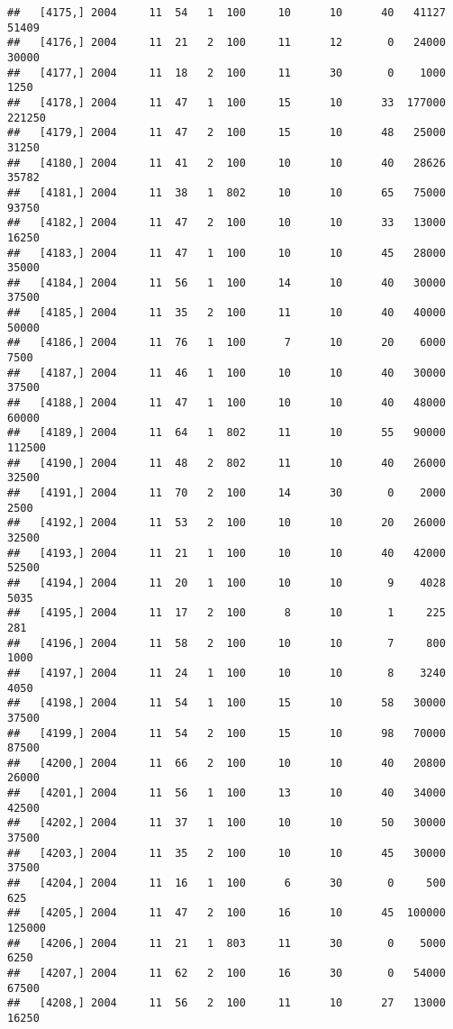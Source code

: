 \documentclass{article}\usepackage[]{graphicx}\usepackage[]{color}
\makeatletter
\newenvironment{kframe}{%
 \def\at@end@of@kframe{}%
 \ifinner\ifhmode%
  \def\at@end@of@kframe{\end{minipage}}%
  \begin{minipage}{\columnwidth}%
 \fi\fi%
 \def\FrameCommand##1{\hskip\@totalleftmargin \hskip-\fboxsep
 \colorbox{shadecolor}{##1}\hskip-\fboxsep
     \hskip-\linewidth \hskip-\@totalleftmargin \hskip\columnwidth}%
 \MakeFramed {\advance\hsize-\width
   \@totalleftmargin\z@ \linewidth\hsize
   \@setminipage}}%
 {\par\unskip\endMakeFramed%
 \at@end@of@kframe}
\newenvironment{knitrout}{}{} %
\makeatother
\begin{document}
\begin{knitrout}
\begin{kframe}
\begin{verbatim}
##   [4175,] 2004     11  54   1  100     10      10      40   41127   51409
##   [4176,] 2004     11  21   2  100     11      12       0   24000   30000
##   [4177,] 2004     11  18   2  100     11      30       0    1000    1250
##   [4178,] 2004     11  47   1  100     15      10      33  177000  221250
##   [4179,] 2004     11  47   2  100     15      10      48   25000   31250
##   [4180,] 2004     11  41   2  100     10      10      40   28626   35782
##   [4181,] 2004     11  38   1  802     10      10      65   75000   93750
##   [4182,] 2004     11  47   2  100     10      10      33   13000   16250
##   [4183,] 2004     11  47   1  100     10      10      45   28000   35000
##   [4184,] 2004     11  56   1  100     14      10      40   30000   37500
##   [4185,] 2004     11  35   2  100     11      10      40   40000   50000
##   [4186,] 2004     11  76   1  100      7      10      20    6000    7500
##   [4187,] 2004     11  46   1  100     10      10      40   30000   37500
##   [4188,] 2004     11  47   1  100     10      10      40   48000   60000
##   [4189,] 2004     11  64   1  802     11      10      55   90000  112500
##   [4190,] 2004     11  48   2  802     11      10      40   26000   32500
##   [4191,] 2004     11  70   2  100     14      30       0    2000    2500
##   [4192,] 2004     11  53   2  100     10      10      20   26000   32500
##   [4193,] 2004     11  21   1  100     10      10      40   42000   52500
##   [4194,] 2004     11  20   1  100     10      10       9    4028    5035
##   [4195,] 2004     11  17   2  100      8      10       1     225     281
##   [4196,] 2004     11  58   2  100     10      10       7     800    1000
##   [4197,] 2004     11  24   1  100     10      10       8    3240    4050
##   [4198,] 2004     11  54   1  100     15      10      58   30000   37500
##   [4199,] 2004     11  54   2  100     15      10      98   70000   87500
##   [4200,] 2004     11  66   2  100     10      10      40   20800   26000
##   [4201,] 2004     11  56   1  100     13      10      40   34000   42500
##   [4202,] 2004     11  37   1  100     10      10      50   30000   37500
##   [4203,] 2004     11  35   2  100     10      10      45   30000   37500
##   [4204,] 2004     11  16   1  100      6      30       0     500     625
##   [4205,] 2004     11  47   2  100     16      10      45  100000  125000
##   [4206,] 2004     11  21   1  803     11      30       0    5000    6250
##   [4207,] 2004     11  62   2  100     16      30       0   54000   67500
##   [4208,] 2004     11  56   2  100     11      10      27   13000   16250

\end{verbatim}
\end{kframe}
\end{knitrout}
\end{document}
